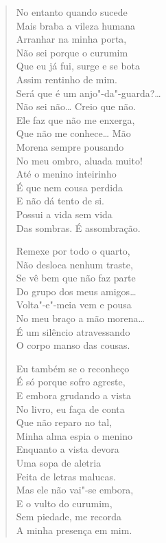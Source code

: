 {\begin{verse}
No entanto quando sucede\\
Mais braba a vileza humana\\
Arranhar na minha porta,\\
Não sei porque o curumim\\
Que eu já fui, surge e se bota\\
Assim rentinho de mim.\\
Será que é um anjo"-da"-guarda?\ldots{}\\
Não sei não\ldots{} Creio que não.\\
Ele faz que não me enxerga,\\
Que não me conhece\ldots{} Mão\\
Morena sempre pousando\\
No meu ombro, aluada muito!\\
Até o menino inteirinho\\
É que nem cousa perdida\\
E não dá tento de si.\\
Possui a vida sem vida\\
Das sombras. É assombração.

Remexe por todo o quarto,\\
Não desloca nenhum traste,\\
Se vê bem que não faz parte\\
Do grupo dos meus amigos\ldots{}\\
Volta"-e"-meia vem e pousa\\
No meu braço a mão morena\ldots{}\\
É um silêncio atravessando\\
O corpo manso das cousas.

Eu também se o reconheço\\
É só porque sofro agreste,\\
E embora grudando a vista\\
No livro, eu faça de conta\\
Que não reparo no tal,\\
Minha alma espia o menino\\
Enquanto a vista devora\\
Uma sopa de aletria\\
Feita de letras malucas.\\
Mas ele não vai"-se embora,\\
E o vulto do curumim,\\
Sem piedade, me recorda\\
A minha presença em mim.


\end{verse}}
